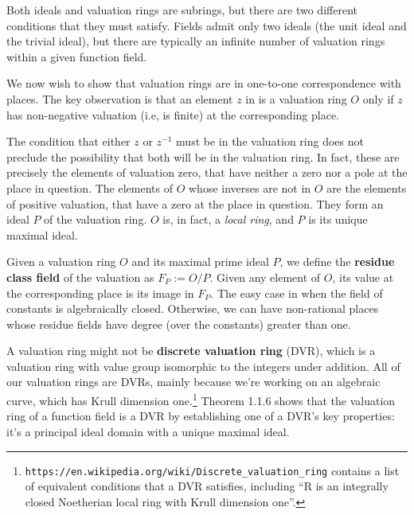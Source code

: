 Both ideals and valuation rings are subrings, but there are two different conditions
that they must satisfy.  Fields admit only two ideals (the unit ideal and the trivial ideal),
but there are typically an infinite number of valuation rings within a given function field.

We now wish to show that valuation rings are in one-to-one correspondence with places.
The key observation is that an element $z$ in is a valuation ring $O$ only if $z$ has
non-negative valuation (i.e, is finite) at the corresponding place.

The condition that either $z$ or $z^{-1}$ must be in the valuation ring does not preclude
the possibility that both will be in the valuation ring.  In fact, these are precisely
the elements of valuation zero, that have neither a zero nor a pole at the place
in question.  The elements of $O$ whose inverses are not in $O$ are the elements of positive
valuation, that have a zero at the place in question.  They form an ideal $P$ of the
valuation ring.  $O$ is, in fact, a {\it local ring}, and $P$ is its unique maximal ideal.

Given a valuation ring $O$ and its maximal prime ideal $P$, we define the {\bf residue class field} of
the valuation as $F_P := O/P$.  Given any element of $O$, its value at the corresponding place is its
image in $F_P$.  The easy case in when the field of constants is algebraically closed.  Otherwise,
we can have non-rational places whose residue fields have degree (over the constants) greater than one.

A valuation ring might not be {\bf discrete valuation ring} (DVR),
which is a valuation ring with value group isomorphic to the integers under addition.
All of our valuation rings are DVRs, mainly because we're working on an algebraic
curve, which has Krull dimension one.\footnote{{\tt https://en.wikipedia.org/wiki/Discrete_valuation_ring}
contains a list of equivalent conditions that a DVR satisfies, including
``R is an integrally closed Noetherian local ring with Krull dimension one''.}
\cite{Stichtenoth} Theorem 1.1.6 shows that the valuation ring of a function
field is a DVR by establishing one of a DVR's key properties: it's
a principal ideal domain with a unique maximal ideal.


